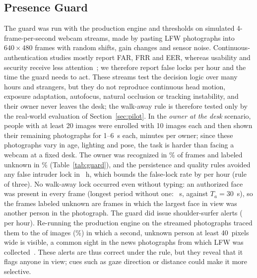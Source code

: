 \documentclass[journal]{IEEEtran}
\begin{document}
\subsection{Presence Guard}\label{sec:guardres}
The guard was run with the production engine and thresholds on simulated 4-frame-per-second webcam streams, made by pasting LFW photographs into $640\times480$ frames with random shifts, gain changes and sensor noise. Continuous-authentication studies mostly report FAR, FRR and EER, whereas usability and security receive less attention~\cite{ayeswarya2024review}; we therefore report false locks per hour and the time the guard needs to act. These streams test the decision logic over many hours and strangers, but they do not reproduce continuous head motion, exposure adaptation, autofocus, natural occlusion or tracking instability, and their owner never leaves the desk; the walk-away rule is therefore tested only by the real-world evaluation of Section~\ref{sec:pilot}. In the \emph{owner at the desk} scenario, \gOwners{} people with at least 20 images were enrolled with 10 images each and then shown their remaining photographs for 1--6~s each, \gMinutes{} minutes per owner; since these photographs vary in age, lighting and pose, the task is harder than facing a webcam at a fixed desk. The owner was recognized in \gMatchFrac\% of frames and labeled unknown in \gUnknownFrac\% (Table~\ref{tab:guard}), and the persistence and quality rules avoided any false intruder lock in \gHours{}~h, which bounds the false-lock rate by \gLockBound{} per hour (rule of three). No walk-away lock occurred even without typing: an authorized face was present in every frame (longest period without one: \gLongestGap~s, against $T_a=30$~s), so the frames labeled unknown are frames in which the largest face in view was another person in the photograph. The guard did issue \gShldAlerts{} shoulder-surfer alerts (\gShldAlertsHour{} per hour). Re-running the production engine on the streamed photographs traced them to the \gdSecond{} of \gdPhotos{} images (\gdSecondPct\%) in which a second, unknown person at least 40~pixels wide is visible, a common sight in the news photographs from which LFW was collected~\cite{huang2007lfw}. These alerts are thus correct under the rule, but they reveal that it flags anyone in view; cues such as gaze direction or distance could make it more selective.
\end{document}
